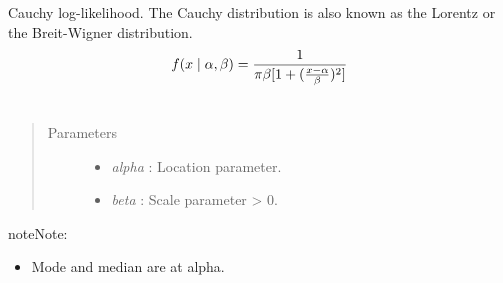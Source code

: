 \documentclass[letterpaper,10pt,english]{sphinxmanual}
\begin{document}

\begin{fulllineitems}
\label{distributions:pymc.distributions.cauchy_like}
Cauchy log-likelihood. The Cauchy distribution is also known as the
Lorentz or the Breit-Wigner distribution.
\begin{gather}
\begin{split}f(x \mid \alpha, \beta) = \frac{1}{\pi \beta [1 + (\frac{x-\alpha}{\beta})^2]}\end{split}\notag\\\begin{split}\end{split}\notag
\end{gather}\begin{quote}\begin{description}
\item[{Parameters }] \leavevmode\begin{itemize}
\item {} 
\emph{alpha} : Location parameter.

\item {} 
\emph{beta} : Scale parameter \textgreater{} 0.

\end{itemize}

\end{description}\end{quote}

\begin{notice}{note}{Note:}\begin{itemize}
\item {} 
Mode and median are at alpha.

\end{itemize}
\end{notice}

\end{fulllineitems}

\end{document}
